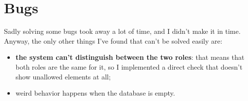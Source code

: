\documentclass[a4paper,12pt]{article}
\begin{document}
\section{Bugs}
Sadly solving some bugs took away a lot of time, and I didn't make it in time. Anyway, the only other things I've found that can't be solved easily are:
\begin{itemize}
  \item \textbf{the system can't distinguish between the two roles}: that means that both roles are the same for it, so I implemented a direct check that doesn't show unallowed elements at all;
  \item weird behavior happens when the database is empty.
\end{itemize}
\end{document}
